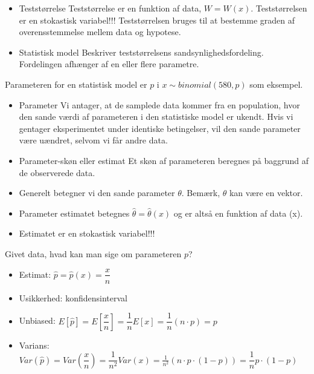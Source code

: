 \documentclass[Main]{subfiles}
\begin{document}
\begin{theo}[Begreber]
\begin{itemize}
	\item Teststørrelse
	\subitem Teststørrelse er en funktion af data, $W = W(x)$.
	\subitem Teststørrelsen er en stokastisk variabel!!!
	\subitem Teststørrelsen bruges til at bestemme graden af overensstemmelse mellem data og hypotese.
	\item Statistisk model
	\subitem Beskriver teststørrelsens sandsynlighedsfordeling.
	\subitem Fordelingen afhænger af en eller flere parametre.
\end{itemize}

Parameteren for en statistisk model er $p$ i $x\sim binomial(580,p)$ som eksempel.

\begin{itemize}
	\item Parameter
\subitem Vi antager, at de samplede data kommer fra en population, hvor den sande værdi af parameteren i den statistiske model er ukendt.
\subitem Hvis vi gentager eksperimentet under identiske betingelser, vil den sande parameter være uændret, selvom vi får andre data.
\item Parameter-skøn eller estimat
\subitem Et skøn af parameteren beregnes på baggrund af de observerede data.
\end{itemize}

\end{theo}






\begin{theo}[Notation]
\begin{itemize}
	\item  Generelt betegner vi den sande parameter $\theta$.
\subitem Bemærk, $\theta$ kan være en vektor.
\item Parameter estimatet betegnes $\hat{\theta} = \hat{\theta}(x)$
\subitem og er altså en funktion af data (x).
\item Estimatet er en stokastisk variabel!!!
\end{itemize}
\end{theo}





\newpage

\begin{theo}[Estimation]
Givet data, hvad kan man sige om parameteren $p$?
\begin{itemize}
	\item Estimat: $\hat{p} = \hat{p}(x) = \dfrac{x}{n}$
	\item Usikkerhed: konfidensinterval
	\item Unbiased: $E[\hat{p}] = E\left[\dfrac{x}{n}\right]=\dfrac{1}{n} E[x] = \dfrac{1}{n}(n \cdot p) = p$
	\item Varians: $Var(\hat{p}) = Var\left(\dfrac{x}{n}\right) = \dfrac{1}{n^2} Var(x)=\frac{1}{n^2}(n \cdot p \cdot (1-p))= \dfrac{1}{n}p \cdot(1-p)$
\end{itemize}
\end{theo}
\end{document}
